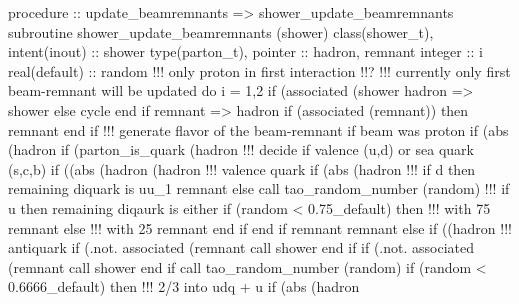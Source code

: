 \eatline
\nwendcode{}\nwdocspar
\nwenddocs{}\plusendmoddef
  procedure :: update_beamremnants => shower_update_beamremnants
\nwendcode{}\plusendmoddef
  subroutine shower_update_beamremnants (shower)
    class(shower_t), intent(inout) :: shower
    type(parton_t), pointer :: hadron, remnant
    integer :: i
    real(default) :: random
    !!! only proton in first interaction !!?
    !!! currently only first beam-remnant will be updated
    do i = 1,2
       if (associated (shower%
          hadron => shower%
       else
          cycle
       end if
       remnant => hadron%
       if (associated (remnant)) then
          remnant%
       end if
       !!! generate flavor of the beam-remnant if beam was proton
       if (abs (hadron%
          if (parton_is_quark (hadron%
             !!! decide if valence (u,d) or sea quark (s,c,b)
             if ((abs (hadron%
                  (hadron%
                !!! valence quark
                if (abs (hadron%
                   !!! if d then remaining diquark is uu_1
                   remnant%
                else
                   call tao_random_number (random)
                   !!! if u then remaining diqaurk is either
                   if (random < 0.75_default) then
                      !!! with 75%
                      remnant%
                   else
                      !!! with 25%
                      remnant%
                   end if
                end if
                remnant%
                remnant%
             else if ((hadron%
                !!! antiquark
                if (.not. associated (remnant%
                   call shower%
                end if
                if (.not. associated (remnant%
                   call shower%
                end if
                call tao_random_number (random)
                if (random < 0.6666_default) then
                   !!! 2/3 into udq + u
                   if (abs (hadron%
